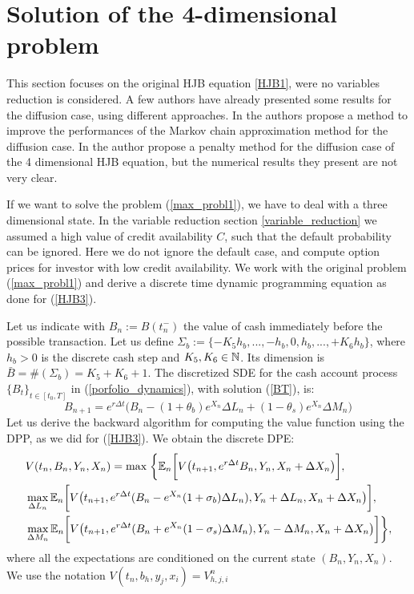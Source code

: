 \section{Solution of the 4-dimensional problem}\label{full_eq_section}

This section focuses on the original HJB equation \ref{HJB1}, were no variables reduction is considered. 
A few authors have already presented some results for the diffusion case, using different approaches.
In \cite{Pal15} the authors propose a method to improve the performances of the Markov chain approximation method for the diffusion case. In \cite{Song14} the author propose
a penalty method for the diffusion case of the 4 dimensional HJB equation, but the numerical results they present are not very clear.

If we want to solve the problem (\ref{max_probl1}), we have to deal with a three dimensional state. In the variable reduction section \ref{variable_reduction}
we assumed a high value of credit availability $C$, such that the default probability can be ignored. 
Here we do not ignore the default case, and compute option prices for investor with low credit availability.
We work with the original problem (\ref{max_probl1}) and derive a discrete time dynamic programming equation as done for (\ref{HJB3}).

Let us indicate with $B_n := B(t^-_n)$ the value of cash immediately before the possible transaction.
Let us define $\Sigma_b := \{-K_5 h_b , ... , -h_b,0,h_b, ... , +K_6 h_b \}$,  
where $h_b>0$ is the discrete cash step and  $K_5,K_6 \in \mathbb{N}$. Its dimension is $\bar B = \#(\Sigma_b) = K_5+K_6+1$.
The discretized SDE for the cash account process $\{B_t\}_{t \in [t_0,T]}$ in (\ref{porfolio_dynamics}), with solution (\ref{BT}), is:
\begin{equation}\label{Bn}
 B_{n+1} =  e^{r \Delta t} \biggl( B_n - (1+\theta_b) e^{X_n} \Delta L_n + (1-\theta_s) e^{X_n} \Delta M_n \biggr)
\end{equation}
Let us derive the backward algorithm for computing the value function using the DPP, as we did for (\ref{HJB3}). %
We obtain the discrete DPE: 
\begin{align}\label{HJB5}
 & V(t_n,B_n,Y_n,X_n) = \max \; \biggl\{ \mathbb{E}_n 
 \biggl[ V \bigl( t_{n+1}, e^{r \Delta t} B_n, Y_n, X_n + \Delta X_n \bigr) \biggr], \\ \nonumber
 & \max_{\Delta L_n} 
 \mathbb{E}_n \biggl[ V \bigl( t_{n+1}, e^{r\Delta t}(B_n - e^{X_n}(1+\sigma_b)\Delta L_n) , Y_n + \Delta L_n, X_n + \Delta X_n \bigr) \biggr] , \\ \nonumber
 & \max_{\Delta M_n}
 \mathbb{E}_n \biggl[ V \bigl( t_{n+1}, e^{r\Delta t}(B_n + e^{X_n}(1-\sigma_s)\Delta M_n) , Y_n - \Delta M_n, X_n + \Delta X_n \bigr) \biggr]
 \biggr\},
\end{align}
where all the expectations are conditioned on the current state $(B_n,Y_n,X_n)$.  We use the notation $V(t_n, b_h, y_j, x_i) = V^n_{h,j,i}$

